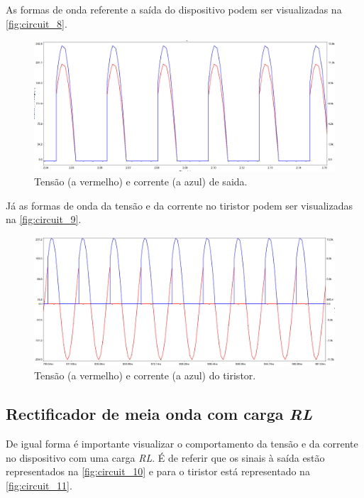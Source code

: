 \documentclass[a4paper,11pt]{article}
\numberwithin{equation}{section}
\begin{document}
As formas de onda referente a saída do dispositivo podem ser visualizadas na \autoref{fig:circuit_8}.

\begin{figure}[h]
	\centering
	\includegraphics[keepaspectratio=true, scale=0.3]{img/circuito6}
	\caption{Tensão (a vermelho) e corrente (a azul) de saida.}
	\label{fig:circuit_8}
	\vspace{-0.8em}
\end{figure}

Já as formas de onda da tensão e da corrente no tiristor podem ser visualizadas na  \autoref{fig:circuit_9}.

\begin{figure}[h]
	\centering
	\includegraphics[keepaspectratio=true, scale=0.3]{img/circuito7}
	\caption{Tensão (a vermelho) e corrente (a azul) do tiristor.}
	\label{fig:circuit_9}
	\vspace{-0.8em}
\end{figure}

\pagebreak
\subsection{Rectificador de meia onda com carga \textit{RL}}

De igual forma é importante visualizar o comportamento da tensão e da corrente no dispositivo com uma carga \textit{RL}. É de referir que os sinais à saída estão representados na \autoref{fig:circuit_10} e para o tiristor está representado na \autoref{fig:circuit_11}.
\end{document}

